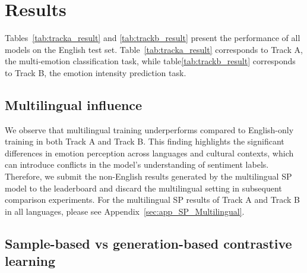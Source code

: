 \documentclass[11pt]{article}
\begin{document}
\section{Results}


Tables~\ref{tab:tracka_result} and \ref{tab:trackb_result} present the performance of all models on the English test set. Table~\ref{tab:tracka_result} corresponds to Track A, the multi-emotion classification task, while table\ref{tab:trackb_result} corresponds to Track B, the emotion intensity prediction task.

\subsection{Multilingual influence}


We observe that multilingual training underperforms compared to English-only training in both Track A and Track B. This finding highlights the significant differences in emotion perception across languages and cultural contexts, which can introduce conflicts in the model’s understanding of sentiment labels. Therefore, we submit the non-English results generated by the multilingual SP model to the leaderboard and discard the multilingual setting in subsequent comparison experiments. For the multilingual SP results of Track A and Track B in all languages, please see Appendix~\ref{sec:app_SP_Multilingual}.

\subsection{Sample-based vs generation-based contrastive learning}

\end{document}
